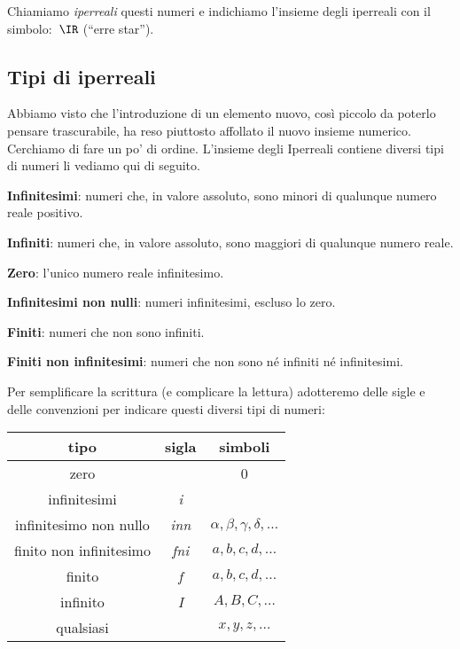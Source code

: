Chiamiamo \emph{iperreali} questi numeri e indichiamo l'insieme degli 
iperreali con il simbolo:~\(\IR\) (``erre star'').

\subsection{Tipi di iperreali}
\label{subsec:insnum_iperreali}

Abbiamo visto che l'introduzione di un elemento nuovo, così piccolo
da poterlo pensare trascurabile, ha reso piuttosto affollato il nuovo 
insieme numerico. 
Cerchiamo di fare un po' di ordine. 
L'insieme degli Iperreali contiene diversi tipi di numeri li vediamo qui di 
seguito.

\begin{description} [noitemsep]
 \item \textbf{Infinitesimi}:
numeri che, in valore assoluto, sono minori di qualunque numero reale 
positivo.
 \item \textbf{Infiniti}:
numeri che, in valore assoluto, sono maggiori di qualunque numero reale.
 \item \textbf{Zero}:
l'unico numero reale infinitesimo.
 \item \textbf{Infinitesimi non nulli}:
numeri infinitesimi, escluso lo zero.
 \item \textbf{Finiti}:
numeri che non sono infiniti.
 \item \textbf{Finiti non infinitesimi}:
numeri che non sono né infiniti né infinitesimi.
\end{description}

Per semplificare la scrittura (e complicare la lettura) adotteremo delle 
sigle e delle convenzioni per indicare questi diversi tipi di numeri:

\begin{center}
\begin{tabular}{ccc}\toprule
tipo & sigla & simboli \\\midrule

zero &  & 0 \\

infinitesimi & \emph{i} & \\

infinitesimo non nullo & \emph{inn} & 
\(\alpha, \beta, \gamma, \delta, \dots\) \\

finito non infinitesimo & \emph{fni} & \(a, b, c, d, \dots\)\\

finito & \emph{f} & \(a, b, c, d, \dots\) \\

infinito & \emph{I} & \(A, B, C, \dots\)\\

qualsiasi &  & \(x, y, z, \dots\) \\\bottomrule
\end{tabular}
\label{tab:insnum_tipi}
\end{center}

